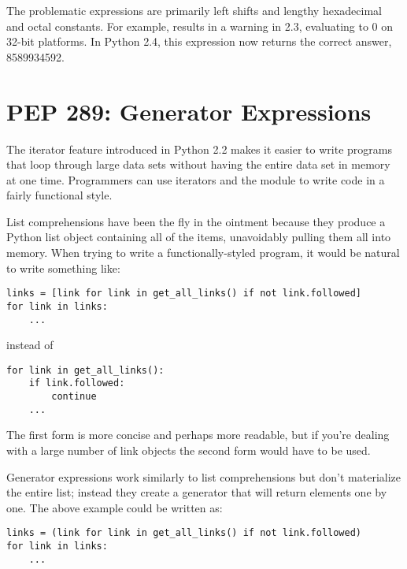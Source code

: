 \documentclass{howto}
\begin{document}
The problematic expressions are primarily left shifts and lengthy
hexadecimal and octal constants.  For example,
 results
in a warning in 2.3, evaluating to 0 on 32-bit platforms.  In Python
2.4, this expression now returns the correct answer, 8589934592.

\begin{seealso}
\end{seealso}

\section{PEP 289: Generator Expressions}

The iterator feature introduced in Python 2.2 makes it easier to write
programs that loop through large data sets without having the entire
data set in memory at one time.  Programmers can use iterators and the
 module to write code in a fairly functional style.

List comprehensions have been the fly in the ointment because they
produce a Python list object containing all of the items, unavoidably
pulling them all into memory.  When trying to write a
functionally-styled program, it would be natural to write something
like:

\begin{verbatim}
links = [link for link in get_all_links() if not link.followed]
for link in links:
    ...
\end{verbatim}

instead of 

\begin{verbatim}
for link in get_all_links():
    if link.followed:
        continue
    ...
\end{verbatim}

The first form is more concise and perhaps more readable, but if
you're dealing with a large number of link objects the second form
would have to be used.

Generator expressions work similarly to list comprehensions but don't
materialize the entire list; instead they create a generator that will
return elements one by one.  The above example could be written as:

\begin{verbatim}
links = (link for link in get_all_links() if not link.followed)
for link in links:
    ...
\end{verbatim}
\end{document}

